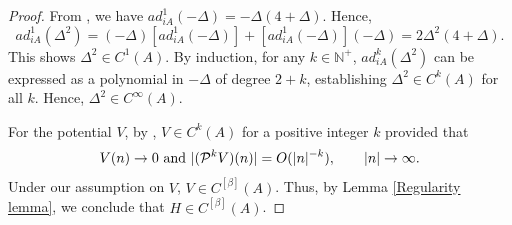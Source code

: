 \documentclass[reqno, 11pt]{amsart}
\newcommand\N{\mathbb{N}}
\newcommand\mcaP{\mathcal{P}}
\numberwithin{equation}{section}
\begin{document}
\begin{proof}
From \cite[Lemma 4.1]{BS99}, we have $ad^{1}_{iA}(-\Delta)=-\Delta(4+\Delta)$. Hence,
$$ad^{1}_{iA}(\Delta^2)=(-\Delta)[ad^{1}_{iA}(-\Delta)]+[ad^{1}_{iA}(-\Delta)](-\Delta)=2\Delta^2(4+\Delta).$$
This shows $\Delta^2\in C^1(A)$. By induction, for any $k\in\N^{+}$, $ad^{k}_{iA}(\Delta^2)$ can be expressed as a polynomial in $-\Delta$ of degree $2+k$, establishing $\Delta^2\in C^{k}(A)$ for all $k$. Hence, $\Delta^2\in C^{\infty}(A)$.

For the potential $V$, by \cite[Proposition 5.1]{BS99}, $V\in C^k(A)$ for a positive integer $k$ provided that
$$V(n)\rightarrow0\ {\rm and}\  |(\mcaP^{k}V)(n)|=O(|n|^{-k}),\qquad|n|\rightarrow\infty.$$
Under our assumption on $V$, $V\in C^{[\beta]}(A)$. Thus, by Lemma \ref{Regularity lemma}, we conclude that $H\in C^{[\beta]}(A)$.
\end{proof}
\normalem
\end{document}

